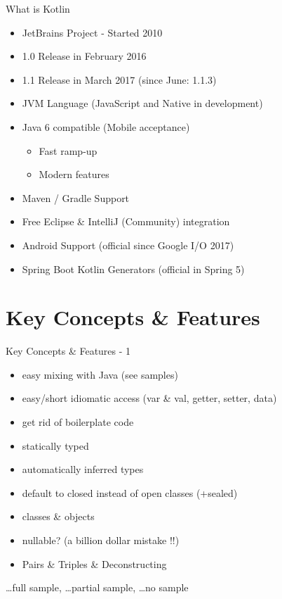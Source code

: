 \begin{frame}{What is Kotlin}
	\begin{itemize}
		\item JetBrains Project - Started 2010
		\item 1.0 Release in February 2016
		\item 1.1 Release in March 2017 (since June: 1.1.3)
		\item JVM Language (JavaScript and Native in development)
		\item Java 6 compatible (Mobile acceptance)
		\begin{itemize}
			\item Fast ramp-up
			\item Modern features 
		\end{itemize}
		\item Maven / Gradle Support
		\item Free Eclipse \& IntelliJ (Community) integration
		\item Android Support (official since Google I/O 2017)
		\item Spring Boot Kotlin Generators (official in Spring 5)
	\end{itemize}
\end{frame}

\section{Key Concepts \& Features}

\begin{frame}{Key Concepts \& Features - 1}
	\begin{itemize}
		\item easy mixing with Java (see samples) \cmark
		\item easy/short idiomatic access (var \& val, getter, setter, data) \cmark
		\item get rid of boilerplate code \cmark
		\item statically typed \cmark
		\item automatically inferred types \cmark
		\item default to closed instead of open classes (+sealed) \tmark
		\item classes \& objects \tmark
		\item nullable? (a billion dollar mistake !!) \cmark
		\item Pairs \& Triples \& Deconstructing \cmark
	\end{itemize}
\cmark \dots full sample, \tmark \dots partial sample, \xmark \dots no sample
\end{frame}


